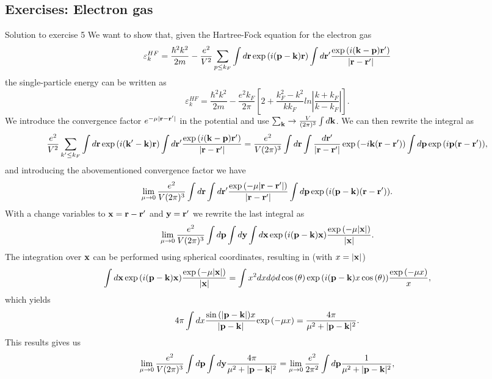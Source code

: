 \documentclass[%
twoside,                 %
final,                   %
10pt]{article}
\begin{document}
\subsection{Exercises: Electron gas}
\begin{block}{Solution to exercise 5 }
We want to show that, given the Hartree-Fock equation for the electron gas
\[
\varepsilon_{k}^{HF}=\frac{\hbar^{2}k^{2}}{2m}-\frac{e^{2}}
{V^{2}}\sum_{p\leq
k_{F}}\int d{\bf r}\exp{(i({\bf p}-{\bf k}){\bf r})}\int
d{\bf r}'\frac{\exp{(i({\bf k}-{\bf p}){\bf r}'})}
{\vert{\bf r}-{\bf r'}\vert}
\]
the single-particle energy can be written as
\[
\varepsilon_{k}^{HF}=\frac{\hbar^{2}k^{2}}{2m}-\frac{e^{2}
k_{F}}{2\pi}
\left[
2+\frac{k_{F}^{2}-k^{2}}{kk_{F}}ln\left\vert\frac{k+k_{F}}
{k-k_{F}}\right\vert
\right].
\]
We introduce the convergence factor 
$e^{-\mu\vert{\bf r}-{\bf r}'\vert}$
in the potential and use  $\sum_{{\bf k}}\rightarrow
\frac{V}{(2\pi)^{3}}\int d{\bf k}$. We can then rewrite the integral as 
\[
\frac{e^{2}}
{V^{2}}\sum_{k'\leq
k_{F}}\int d{\bf r}\exp{(i({\bf k'}-{\bf k}){\bf r})}\int
d{\bf r}'\frac{\exp{(i({\bf k}-{\bf p}){\bf r}'})}
{\vert{\bf r}-{\bf r'}\vert}=\frac{e^{2}}{V (2\pi)^3}  \int d{\bf r}\int
\frac{d{\bf r}'}{\vert{\bf r}-{\bf r'}\vert}\exp{(-i{\bf k}({\bf r}-{\bf r}'))}\int d{\bf p}\exp{(i{\bf p}({\bf r}-{\bf r}'))},
\]
and introducing the abovementioned convergence factor we have
\[
\lim_{\mu \to 0}\frac{e^{2}}{V (2\pi)^3}  \int d{\bf r}\int d{\bf r}'\frac{\exp{(-\mu\vert{\bf r}-{\bf r}'\vert})}{\vert{\bf r}-{\bf r'}\vert}\int d{\bf p}\exp{(i({\bf p}-{\bf k})({\bf r}-{\bf r}'))}.
\]
With a change variables to ${\bf x} = {\bf r}-{\bf r}'$ and ${\bf y}={\bf r}'$ we rewrite the last integral as
\[
\lim_{\mu \to 0}\frac{e^{2}}{V (2\pi)^3}  \int d{\bf p}\int d{\bf y}\int d{\bf x}\exp{(i({\bf p}-{\bf k}){\bf x})}\frac{\exp{(-\mu\vert{\bf x}\vert})}{\vert{\bf x}\vert}.
\]
The integration over ${\bf x}$ can be performed using spherical coordinates, resulting in (with $x=\vert {\bf x}\vert$)
\[
\int d{\bf x}\exp{(i({\bf p}-{\bf k}){\bf x})}\frac{\exp{(-\mu\vert{\bf x}\vert})}{\vert{\bf x}\vert}=\int x^2 dx d\phi d\cos{(\theta)}\exp{(i({\bf p}-{\bf k})x\cos{(\theta))}}\frac{\exp{(-\mu x)}}{x},
\]
which yields
\[
4\pi \int dx \frac{ \sin{(\vert {\bf p}-{\bf k}\vert)x} }{\vert {\bf p}-{\bf k}\vert}{\exp{(-\mu x)}}= \frac{4\pi}{\mu^2+\vert {\bf p}-{\bf k}\vert^2}.
\]
This results gives us 
\[
\lim_{\mu \to 0}\frac{e^{2}}{V (2\pi)^3}  \int d{\bf p}\int d{\bf y}\frac{4\pi}{\mu^2+\vert {\bf p}-{\bf k}\vert^2}=\lim_{\mu \to 0}\frac{e^{2}}{ 2\pi^2}  \int d{\bf p}\frac{1}{\mu^2+\vert {\bf p}-{\bf k}\vert^2},
\]
\end{block}
\end{document}
